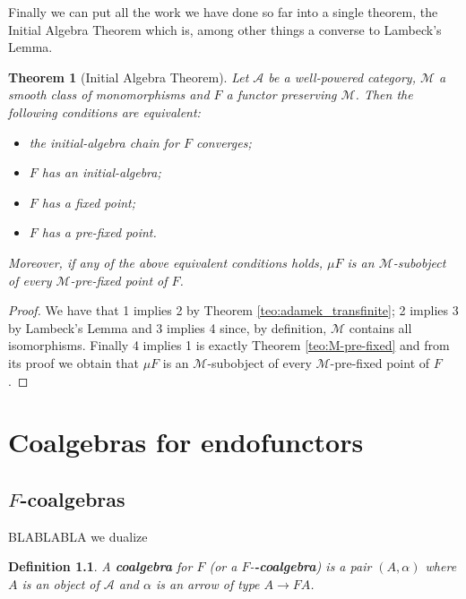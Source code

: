 \documentclass[letterpaper, 11pt, oneside]{memoir}
\theoremstyle{myteo}
\newtheorem{theorem}{Theorem}[section]
\newtheorem{definition}[theorem]{Definition}
\numberwithin{equation}{section}
\newcommand{\marginnote}[1]{\marginpar{\footnotesize #1}}
\newcommand{\A}{\mathscr{A}}
\begin{document}
Finally we can put all the work we have done so far into a single theorem, the Initial Algebra Theorem which is, among other things a converse to Lambeck's Lemma.

\begin{theorem}[Initial Algebra Theorem]
  \label{teo:initial-algebra-theorem}
  Let \(\A\) be a well-powered category, \(\mathcal{M}\) a smooth class of monomorphisms and \(F\) a functor preserving \(\mathcal{M}\).
  Then the following conditions are equivalent:
  \begin{itemize}
  \item[1.] the initial-algebra chain for \(F\) converges;
  \item[2.] \(F\) has an initial-algebra;
  \item[3.] \(F\) has a fixed point;
  \item[4.] \(F\) has a pre-fixed point.
  \end{itemize}
  Moreover, if any of the above equivalent conditions holds, \(\mu F\) is an \(\mathcal{M}\)-subobject of every \(\mathcal{M}\)-pre-fixed point of \(F\).
\end{theorem}

\begin{proof}
  We have that 1 implies 2 by Theorem \ref{teo:adamek_transfinite}; 2 implies 3 by Lambeck's Lemma and 3 implies 4 since, by definition, \(\mathcal{M}\) contains all isomorphisms.
  Finally 4 implies 1 is exactly Theorem \ref{teo:M-pre-fixed} and from its proof we obtain that \(\mu F\) is an \(\mathcal{M}\)-subobject of every \(\mathcal{M}\)-pre-fixed point of \(F\).
\end{proof}

\chapter{Coalgebras for endofunctors}
\newpage

\section{\(F\)-coalgebras}

BLABLABLA we dualize

\begin{definition}
  A \textbf{coalgebra} for \(F\) (or a \(F\)-\textbf{-coalgebra})\marginnote{\(F\)-coalgebra} is a pair \((A, \alpha)\) where \(A\) is an object of \(\A\) and \(\alpha\) is an arrow of type \(A \to FA\).
\end{definition}
\end{document}
